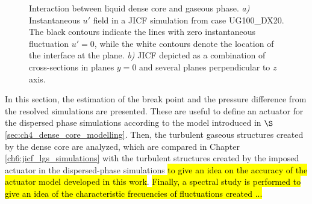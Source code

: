 
\begin{figure}[ht]
\flushleft
{}
\caption[Interaction between liquid dense core and gaseous phase.]{Interaction between liquid dense core and gaseous phase. \textsl{a)} Instantaneous $u'$ field in a JICF simulation from case UG100\_DX20. The black contours indicate the lines with zero instantaneous fluctuation $u' = 0$, while the white contours denote the location of the interface at the plane. \textsl{b)} JICF depicted as a combination of cross-sections in planes $y = 0$ and several planes perpendicular to $z$ axis.}
\label{fig:jet_air_interaction_up_and_skeleton}
\end{figure}

In this section, the estimation of the break point and the pressure difference from the resolved simulations are presented. These are useful to define an actuator for the dispersed phase simulations according to the model introduced in $\S$\ref{sec:ch4_dense_core_modelling}. Then, the turbulent gaseous structures created by the dense core are analyzed, which are compared in Chapter \ref{ch6:jicf_lgs_simulations} with the turbulent structures created by the imposed actuator in the dispersed-phase simulations \hl{to give an idea on the accuracy of the actuator model developed in this work}. \hl{Finally, a spectral study is performed to give an idea of the characteristic frecuencies of fluctuations created ...}


